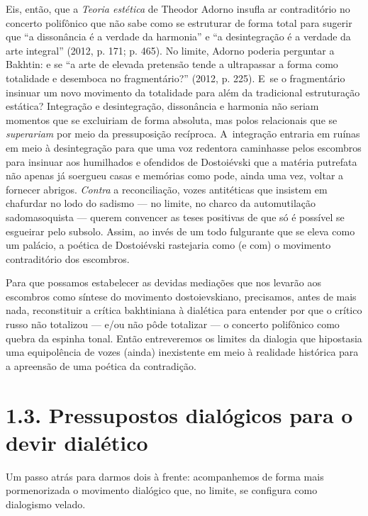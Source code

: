 Eis, então, que a \emph{Teoria estética} de Theodor Adorno insufla ar
contraditório no concerto polifônico que não sabe como se estruturar de
forma total para sugerir que ``a dissonância é a verdade da harmonia'' e
``a desintegração é a verdade da arte integral'' (2012, p. 171; p. 465).
No limite, Adorno poderia perguntar a Bakhtin: e se ``a arte de elevada
pretensão tende a ultrapassar a forma como totalidade e desemboca no
fragmentário?'' (2012, p. 225). E~se o fragmentário insinuar um novo
movimento da totalidade para além da tradicional estruturação estática?
Integração e desintegração, dissonância e harmonia não seriam momentos
que se excluiriam de forma absoluta, mas polos relacionais que se
\emph{superariam} por meio da pressuposição recíproca. A~integração
entraria em ruínas em meio à desintegração para que uma voz redentora
caminhasse pelos escombros para insinuar aos humilhados e ofendidos de
Dostoiévski que a matéria putrefata não apenas já soergueu casas e
memórias como pode, ainda uma vez, voltar a fornecer abrigos.
\emph{Contra} a reconciliação, vozes antitéticas que insistem em
chafurdar no lodo do sadismo --- no limite, no charco da automutilação
sadomasoquista --- querem convencer as teses positivas de que só é
possível se esgueirar pelo subsolo. Assim, ao invés de um todo
fulgurante que se eleva como um palácio, a poética de Dostoiévski
rastejaria como (e com) o movimento contraditório dos escombros.

Para que possamos estabelecer as devidas mediações que nos levarão aos
escombros como síntese do movimento dostoievskiano, precisamos, antes de
mais nada, reconstituir a crítica bakhtiniana à dialética para entender
por que o crítico russo não totalizou --- e/ou não pôde totalizar --- o
concerto polifônico como quebra da espinha tonal. Então entreveremos os
limites da dialogia que hipostasia uma equipolência de vozes (ainda)
inexistente em meio à realidade histórica para a apreensão de uma
poética da contradição.

\section{1.3. Pressupostos dialógicos para o devir dialético}

Um passo atrás para darmos dois à frente: acompanhemos de forma mais
pormenorizada o movimento dialógico que, no limite, se configura como
dialogismo velado.

